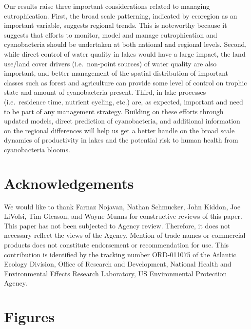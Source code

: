 \documentclass[12pt,]{article}
\begin{document}
Our results raise three important considerations related to managing
eutrophication. First, the broad scale patterning, indicated by
ecoregion as an important variable, suggests regional trends. This is
noteworthy because it suggests that efforts to monitor, model and manage
eutrophication and cyanobacteria should be undertaken at both national
and regional levels. Second, while direct control of water quality in
lakes would have a large impact, the land use/land cover drivers
(i.e.~non-point sources) of water quality are also important, and better
management of the spatial distribution of important classes such as
forest and agriculture can provide some level of control on trophic
state and amount of cyanobacteria present. Third, in-lake processes
(i.e.~residence time, nutrient cycling, etc.) are, as expected,
important and need to be part of any management strategy. Building on
these efforts through updated models, direct prediction of
cyanobacteria, and additional information on the regional differences
will help us get a better handle on the broad scale dynamics of
productivity in lakes and the potential risk to human health from
cyanobacteria blooms.

\section{Acknowledgements}\label{acknowledgements}

We would like to thank Farnaz Nojavan, Nathan Schmucker, John Kiddon,
Joe LiVolsi, Tim Gleason, and Wayne Munns for constructive reviews of
this paper. This paper has not been subjected to Agency review.
Therefore, it does not necessary reflect the views of the Agency.
Mention of trade names or commercial products does not constitute
endorsement or recommendation for use. This contribution is identified
by the tracking number ORD-011075 of the Atlantic Ecology Division,
Office of Research and Development, National Health and Environmental
Effects Research Laboratory, US Environmental Protection Agency.

\newpage

\section{Figures}\label{figures}
\end{document}
